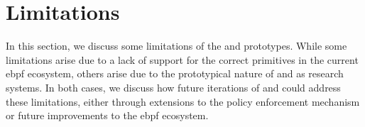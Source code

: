 


\section{Limitations}%
\label{s:disc-limitations}

In this section, we discuss some limitations of the \bpfbox{} and \bpfcontain{}
prototypes. While some limitations arise due to a lack of support for the correct
primitives in the current \gls{ebpf} ecosystem, others arise due to the prototypical
nature of \bpfbox{} and \bpfcontain{} as research systems. In both cases, we discuss how
future iterations of \bpfbox{} and \bpfcontain{} could address these limitations, either
through extensions to the policy enforcement mechanism or future improvements to the
\gls{ebpf} ecosystem.


